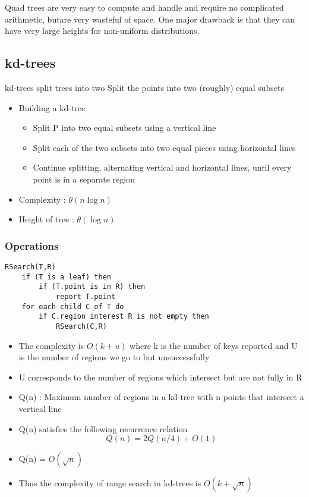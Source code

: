 \documentclass{article}
\begin{document}
Quad trees are very easy to compute and handle and require no complicated arithmetic, butare very wasteful of space. One major drawback is that they can have very large heights for non-uniform distributions.

\subsection*{kd-trees}
kd-trees split trees into two Split the points into two (roughly) equal subsets
\begin{itemize}
\item Building a kd-tree
\begin{itemize}
\item Split P into two equal subsets using a vertical line
\item Split each of the two subsets into two equal pieces using horizontal lines
\item Continue splitting, alternating vertical and horizontal lines, until every
point is in a separate region
\end{itemize}
\item Complexity : \(\theta(n \log n)\)
\item Height of tree : \(\theta(\log n)\)
\end{itemize}

\subsubsection*{Operations}
\begin{lstlisting}
RSearch(T,R)
	if (T is a leaf) then 
		if (T.point is in R) then 
			report T.point 
	for each child C of T do 
		if C.region interest R is not empty then 
			RSearch(C,R)
\end{lstlisting}

\begin{itemize}
\item The complexity is \(O(k+u)\) where k is the number of keys reported and U is the number of regions we go to but unsuccessfully
\item U corresponds to the number of regions which intersect but are not fully in R
\item Q(n) : Maximum number of regions in a kd-tree with n points that intersect a vertical line
\item Q(n) satisfies the following recurrence relation 
$$ Q(n) = 2 Q(n/4 ) + O(1) $$
\item Q(n) = \(O(\sqrt{n})\)
\item Thus the complexity of range search in kd-trees is \(O(k + \sqrt{n})\)
\end{itemize}
\end{document}
